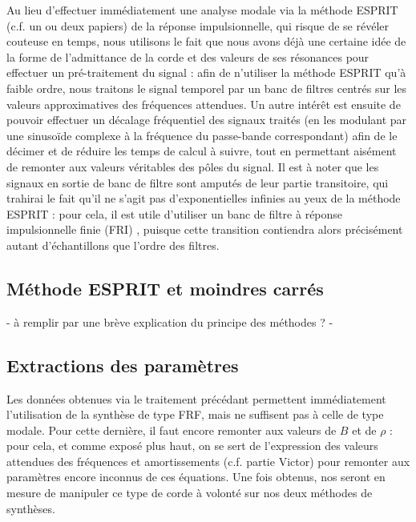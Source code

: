 Au lieu d'effectuer immédiatement une analyse modale via la méthode ESPRIT
(c.f. un ou deux papiers) de la réponse impulsionnelle, qui risque de se
révéler couteuse en temps, nous utilisons le fait que nous avons déjà une
certaine idée de la forme de l'admittance de la corde et des valeurs de ses
résonances pour effectuer un pré-traitement du signal : afin de n'utiliser la
méthode ESPRIT qu'à faible ordre, nous traitons le signal temporel par un banc
de filtres centrés sur les valeurs approximatives des fréquences attendues. Un
autre intérêt est ensuite de pouvoir effectuer un décalage fréquentiel des
signaux traités (en les modulant par une sinusoïde complexe à la fréquence du
passe-bande correspondant) afin de le décimer et de réduire les temps de calcul
à suivre, tout en permettant aisément de remonter aux valeurs véritables des
pôles du signal. Il est à noter que les signaux en sortie de banc de filtre
sont amputés de leur partie transitoire, qui trahirai le fait qu'il ne s'agit
pas d'exponentielles infinies au yeux de la méthode ESPRIT : pour cela, il est
utile d'utiliser un banc de filtre à réponse impulsionnelle finie (FRI) ,
puisque cette transition contiendra alors précisément autant d'échantillons que
l'ordre des filtres.

\subsection{Méthode ESPRIT et moindres carrés}

- à remplir par une brève explication du principe des méthodes ? -


\subsection{Extractions des paramètres}

Les données obtenues via le traitement précédant permettent immédiatement
l'utilisation de la synthèse de type FRF, mais ne suffisent pas à celle de type
modale. Pour cette dernière, il faut encore remonter aux valeurs de $B$ et de
$\rho$ : pour cela, et comme exposé plus haut, on se sert de l'expression des
valeurs attendues des fréquences et amortissements (c.f. partie Victor) pour
remonter aux paramètres encore inconnus de ces équations. Une fois obtenus, nos
seront en mesure de manipuler ce type de corde à volonté sur nos deux méthodes
de synthèses.



